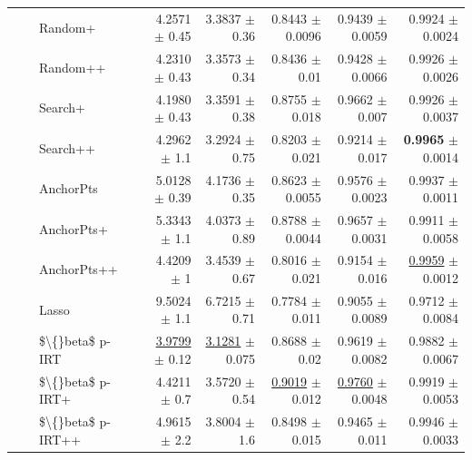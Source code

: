 \begin{longtable}{llp{}rrrrr}
 &  & Random+ & 4.2571 {\scriptsize $\pm$ 0.45} & 3.3837 {\scriptsize $\pm$ 0.36} & 0.8443 {\scriptsize $\pm$ 0.0096} & 0.9439 {\scriptsize $\pm$ 0.0059} & 0.9924 {\scriptsize $\pm$ 0.0024} \\
 &  & Random++ & 4.2310 {\scriptsize $\pm$ 0.43} & 3.3573 {\scriptsize $\pm$ 0.34} & 0.8436 {\scriptsize $\pm$ 0.01} & 0.9428 {\scriptsize $\pm$ 0.0066} & 0.9926 {\scriptsize $\pm$ 0.0026} \\
 &  & Search+ & 4.1980 {\scriptsize $\pm$ 0.43} & 3.3591 {\scriptsize $\pm$ 0.38} & 0.8755 {\scriptsize $\pm$ 0.018} & 0.9662 {\scriptsize $\pm$ 0.007} & 0.9926 {\scriptsize $\pm$ 0.0037} \\
 &  & Search++ & 4.2962 {\scriptsize $\pm$ 1.1} & 3.2924 {\scriptsize $\pm$ 0.75} & 0.8203 {\scriptsize $\pm$ 0.021} & 0.9214 {\scriptsize $\pm$ 0.017} & \textbf{0.9965} {\scriptsize $\pm$ 0.0014} \\
 &  & AnchorPts & 5.0128 {\scriptsize $\pm$ 0.39} & 4.1736 {\scriptsize $\pm$ 0.35} & 0.8623 {\scriptsize $\pm$ 0.0055} & 0.9576 {\scriptsize $\pm$ 0.0023} & 0.9937 {\scriptsize $\pm$ 0.0011} \\
 &  & AnchorPts+ & 5.3343 {\scriptsize $\pm$ 1.1} & 4.0373 {\scriptsize $\pm$ 0.89} & 0.8788 {\scriptsize $\pm$ 0.0044} & 0.9657 {\scriptsize $\pm$ 0.0031} & 0.9911 {\scriptsize $\pm$ 0.0058} \\
 &  & AnchorPts++ & 4.4209 {\scriptsize $\pm$ 1} & 3.4539 {\scriptsize $\pm$ 0.67} & 0.8016 {\scriptsize $\pm$ 0.021} & 0.9154 {\scriptsize $\pm$ 0.016} & \underline{0.9959} {\scriptsize $\pm$ 0.0012} \\
 &  & Lasso & 9.5024 {\scriptsize $\pm$ 1.1} & 6.7215 {\scriptsize $\pm$ 0.71} & 0.7784 {\scriptsize $\pm$ 0.011} & 0.9055 {\scriptsize $\pm$ 0.0089} & 0.9712 {\scriptsize $\pm$ 0.0084} \\
 &  & \$\textbackslash\{\}beta\$ p-IRT & \underline{3.9799} {\scriptsize $\pm$ 0.12} & \underline{3.1281} {\scriptsize $\pm$ 0.075} & 0.8688 {\scriptsize $\pm$ 0.02} & 0.9619 {\scriptsize $\pm$ 0.0082} & 0.9882 {\scriptsize $\pm$ 0.0067} \\
 &  & \$\textbackslash\{\}beta\$ p-IRT+ & 4.4211 {\scriptsize $\pm$ 0.7} & 3.5720 {\scriptsize $\pm$ 0.54} & \underline{0.9019} {\scriptsize $\pm$ 0.012} & \underline{0.9760} {\scriptsize $\pm$ 0.0048} & 0.9919 {\scriptsize $\pm$ 0.0053} \\
 &  & \$\textbackslash\{\}beta\$ p-IRT++ & 4.9615 {\scriptsize $\pm$ 2.2} & 3.8004 {\scriptsize $\pm$ 1.6} & 0.8498 {\scriptsize $\pm$ 0.015} & 0.9465 {\scriptsize $\pm$ 0.011} & 0.9946 {\scriptsize $\pm$ 0.0033} \\

\end{longtable}

